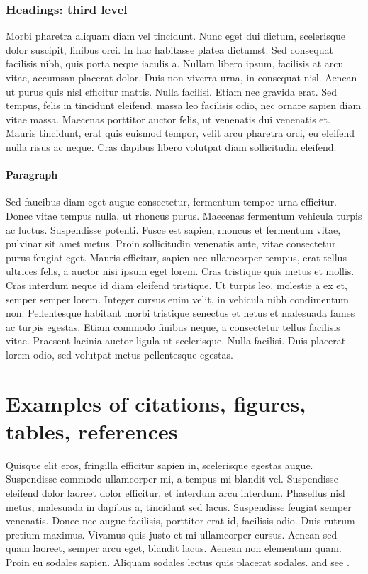 \documentclass{article}
\begin{document}
\subsubsection{Headings: third level}
Morbi pharetra aliquam diam vel tincidunt. Nunc eget dui dictum, scelerisque dolor suscipit, finibus orci. In hac habitasse platea dictumst. Sed consequat facilisis nibh, quis porta neque iaculis a. Nullam libero ipsum, facilisis at arcu vitae, accumsan placerat dolor. Duis non viverra urna, in consequat nisl. Aenean ut purus quis nisl efficitur mattis. Nulla facilisi. Etiam nec gravida erat. Sed tempus, felis in tincidunt eleifend, massa leo facilisis odio, nec ornare sapien diam vitae massa. Maecenas porttitor auctor felis, ut venenatis dui venenatis et. Mauris tincidunt, erat quis euismod tempor, velit arcu pharetra orci, eu eleifend nulla risus ac neque. Cras dapibus libero volutpat diam sollicitudin eleifend. 


\paragraph{Paragraph}
Sed faucibus diam eget augue consectetur, fermentum tempor urna efficitur. Donec vitae tempus nulla, ut rhoncus purus. Maecenas fermentum vehicula turpis ac luctus. Suspendisse potenti. Fusce est sapien, rhoncus et fermentum vitae, pulvinar sit amet metus. Proin sollicitudin venenatis ante, vitae consectetur purus feugiat eget. Mauris efficitur, sapien nec ullamcorper tempus, erat tellus ultrices felis, a auctor nisi ipsum eget lorem. Cras tristique quis metus et mollis. Cras interdum neque id diam eleifend tristique. Ut turpis leo, molestie a ex et, semper semper lorem. Integer cursus enim velit, in vehicula nibh condimentum non. Pellentesque habitant morbi tristique senectus et netus et malesuada fames ac turpis egestas. Etiam commodo finibus neque, a consectetur tellus facilisis vitae. Praesent lacinia auctor ligula ut scelerisque. Nulla facilisi. Duis placerat lorem odio, sed volutpat metus pellentesque egestas. 


\section{Examples of citations, figures, tables, references}
\label{sec:others}
Quisque elit eros, fringilla efficitur sapien in, scelerisque egestas augue. Suspendisse commodo ullamcorper mi, a tempus mi blandit vel. Suspendisse eleifend dolor laoreet dolor efficitur, et interdum arcu interdum. Phasellus nisl metus, malesuada in dapibus a, tincidunt sed lacus. Suspendisse feugiat semper venenatis. Donec nec augue facilisis, porttitor erat id, facilisis odio. Duis rutrum pretium maximus. Vivamus quis justo et mi ullamcorper cursus. Aenean sed quam laoreet, semper arcu eget, blandit lacus. Aenean non elementum quam. Proin eu sodales sapien. Aliquam sodales lectus quis placerat sodales. \cite{kour2014real,kour2014fast} and see \cite{hadash2018estimate}.
\end{document}
